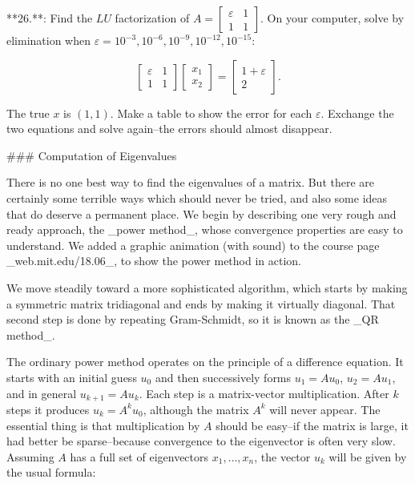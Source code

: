 

**26.**: Find the \(LU\) factorization of \(A=\left[\begin{smallmatrix}\varepsilon&1\\ 1&1\end{smallmatrix}\right]\). On your computer, solve by elimination when \(\varepsilon=10^{-3},10^{-6},10^{-9},10^{-12},10^{-15}\):

\[\left[\begin{matrix}\varepsilon&1\\ 1&1\end{matrix}\right]\left[\begin{matrix}x_{1}\\ x_{2}\end{matrix}\right]=\left[\begin{matrix}1+\varepsilon\\ 2\end{matrix}\right].\]

The true \(x\) is \((1,1)\). Make a table to show the error for each \(\varepsilon\). Exchange the two equations and solve again--the errors should almost disappear.

### Computation of Eigenvalues

There is no one best way to find the eigenvalues of a matrix. But there are certainly some terrible ways which should never be tried, and also some ideas that do deserve a permanent place. We begin by describing one very rough and ready approach, the _power method_, whose convergence properties are easy to understand. We added a graphic animation (with sound) to the course page _web.mit.edu/18.06_, to show the power method in action.

We move steadily toward a more sophisticated algorithm, which starts by making a symmetric matrix tridiagonal and ends by making it virtually diagonal. That second step is done by repeating Gram-Schmidt, so it is known as the _QR method_.

The ordinary power method operates on the principle of a difference equation. It starts with an initial guess \(u_{0}\) and then successively forms \(u_{1}=Au_{0}\), \(u_{2}=Au_{1}\), and in general \(u_{k+1}=Au_{k}\). Each step is a matrix-vector multiplication. After \(k\) steps it produces \(u_{k}=A^{k}u_{0}\), although the matrix \(A^{k}\) will never appear. The essential thing is that multiplication by \(A\) should be easy--if the matrix is large, it had better be sparse--because convergence to the eigenvector is often very slow. Assuming \(A\) has a full set of eigenvectors \(x_{1},\ldots,x_{n}\), the vector \(u_{k}\) will be given by the usual formula:

